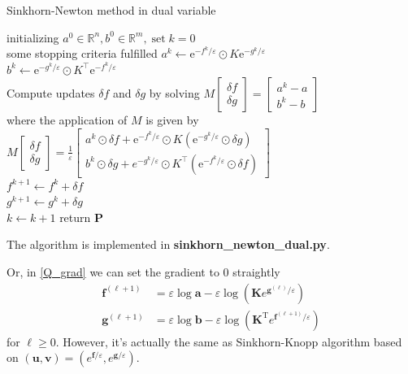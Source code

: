 \documentclass{article}
\begin{document}
\begin{large}
\begin{algorithm}[H]
  \SetAlgoNoLine
  \caption{Sinkhorn-Newton method in dual variable} 
  initializing $a ^ { 0 } \in \mathbb { R } ^ { n } , b ^ { 0 } \in \mathbb { R } ^ { m } , \operatorname { set } k = 0$\\
  \Repeat
  { some stopping criteria fulfilled }{
 $a ^ { k }\gets  \mathrm { e } ^ { - f ^ { k } / \varepsilon } \odot K \mathrm { e } ^ { - g ^ { k } / \varepsilon }$\\
 $b ^ { k } \gets  \mathrm { e } ^ { - g ^ { k } / \varepsilon } \odot K ^ { \top } \mathrm { e } ^ { - f ^ { k } / \varepsilon }$\\
 Compute updates $\delta f$ and $\delta g$ by solving
$M \left[ \begin{array} { c } { \delta f } \\ { \delta g } \end{array} \right] = \left[ \begin{array} { c } { a ^ { k } - a } \\ { b ^ { k } - b } \end{array} \right]$\\
   where the application of $M$ is given by
$M \left[ \begin{array} { c } { \delta f } \\ { \delta g } \end{array} \right] = \frac { 1 } { \varepsilon } \left[ \begin{array} { c } { a ^ { k } \odot \delta f + \mathrm { e } ^ { - f ^ { k } / \varepsilon } \odot K \left( \mathrm { e } ^ { - g ^ { k } / \varepsilon } \odot \delta g \right) } \\ { b ^ { k } \odot \delta g + e ^ { - g ^ { k } / \varepsilon } \odot K ^ { \top } \left( \mathrm { e } ^ { - f ^ { k } / \varepsilon } \odot \delta f \right) } \end{array} \right]$\\
$f ^ { k + 1 } \gets f ^ { k } + \delta f$\\
$g ^ { k + 1 } \gets  g ^ { k } + \delta g$\\
$k\gets k+1$
  }
  return $\mathbf{P}$
\end{algorithm}
The algorithm is implemented in \textbf{sinkhorn\_newton\_dual.py}.

Or, in \ref{Q_grad} we can set the gradient to 0 straightly
\begin{align}
\mathbf { f } ^ { ( \ell + 1 ) } &= \varepsilon \log \mathbf { a } - \varepsilon \log \left( \mathbf { K } e ^ { \mathbf { g } ^ { ( \ell ) } / \varepsilon } \right)\label{f_update}\\
\mathbf { g } ^ { ( \ell + 1 ) } &= \varepsilon \log \mathbf { b } - \varepsilon \log \left( \mathbf { K } ^ { \mathrm { T } } e ^ { \mathbf { f } ^ { ( \ell + 1 ) } / \varepsilon } \right)
\label{g_update}
\end{align}
for $\ell \ge0$. However, it's actually the same as Sinkhorn-Knopp algorithm based on $( \mathbf { u } , \mathbf { v } ) = \left( e ^ { \mathbf { f } / \varepsilon } , e ^ { \mathbf { g } / \varepsilon } \right)$.


\end{large}
\end{document}
